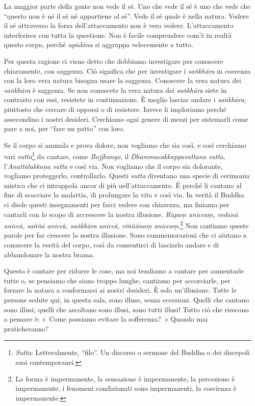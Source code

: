 La maggior parte della gente non vede il sé. Uno che vede il sé è uno
che vede che ``questo non è né il sé né appartiene al sé''. Vede il sé
quale è nella natura. Vedere il sé attraverso la forza
dell'attaccamento non è vero vedere. L'attaccamento interferisce con
tutta la questione. Non è facile comprendere com'è in realtà questo
corpo, perché \emph{upādāna} si aggrappa velocemente a tutto.

Per questa ragione ci viene detto che dobbiamo investigare per conoscere
chiaramente, con saggezza. Ciò significa che per investigare i
\emph{saṅkhāra} in coerenza con la loro vera natura bisogna usare la
saggezza. Conoscere la vera natura dei \emph{saṅkhāra} è saggezza. Se
non conoscete la vera natura dei \emph{saṅkhāra} siete in contrasto con
essi, resistete in continuazione. È meglio lasciar andare i
\emph{saṅkhāra}, piuttosto che cercare di opporsi o di resistere. Invece
li imploriamo perché assecondino i nostri desideri. Cerchiamo ogni
genere di mezzi per sistemarli come pare a noi, per ``fare un patto''
con loro.

Se il corpo si ammala e prova dolore, non vogliamo che sia così, e così
cerchiamo vari \emph{sutta}\footnote{\emph{Sutta}: Letteralmente,
  ``filo''. Un discorso o sermone del Buddha o dei discepoli suoi
  contemporanei.} da cantare, come \emph{Bojjhango}, il
\emph{Dhammacakkappavattana sutta}, l'\emph{Anattālakkaṇa sutta} e così
via. Non vogliamo che il corpo sia dolorante, vogliamo proteggerlo,
controllarlo. Questi \emph{sutta} diventano una specie di cerimonia
mistica che ci intrappola ancor di più nell'attaccamento. È perché li
cantano al fine di scacciare la malattia, di prolungare la vita e così
via. In verità il Buddha ci diede questi insegnamenti per farci vedere
con chiarezza, ma finiamo per cantarli con lo scopo di accrescere la
nostra illusione. \emph{Rūpaṃ aniccaṃ, vedanā aniccā, saññā aniccā,
saṅkhāra} \emph{aniccā, viññānaṃ aniccaṃ}.\footnote{La forma è
  impermanente, la sensazione è impermanente, la percezione è
  impermanente, i fenomeni condizionati sono impermanenti, la coscienza
  è impermanente.} Non cantiamo queste parole per far crescere la nostra
illusione. Sono rammemorazioni che ci aiutano a conoscere la verità del
corpo, così da consentirci di lasciarlo andare e di abbandonare la
nostra brama.

Questo è cantare per ridurre le cose, ma noi tendiamo a cantare per
aumentarle tutte o, se pensiamo che siano troppo lunghe, cantiamo per
accorciarle, per forzare la natura a conformarsi ai nostri desideri. È
solo un'illusione. Tutte le persone sedute qui, in questa sala, sono
illuse, senza eccezioni. Quelli che cantano sono illusi, quelli che
ascoltano sono illusi, sono tutti illusi! Tutto ciò che riescono a
pensare è: «~Come possiamo evitare la sofferenza?~» Quando mai
praticheranno?

